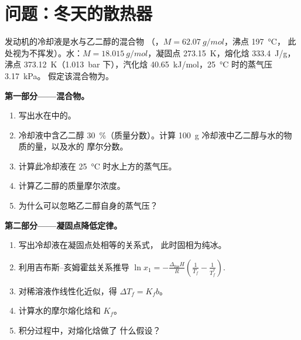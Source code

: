 \section{问题：冬天的散热器}

\begin{problem}
\label{pb:b2:chemical-potential:1}
发动机的冷却液是水与乙二醇的混合物
（，$M = \qty{62.07}{g/mol}$，沸点 \qty{197}{\celsius}，
此处视为不挥发）。水：$M = \qty{18.015}{g/mol}$，凝固点
\qty{273.15}{K}，熔化焓 \qty{333.4}{J/g}，沸点
\qty{373.12}{K}（\qty{1.013}{bar} 下），汽化焓
\qty{40.65}{kJ/mol}，\qty{25}{\celsius} 时的蒸气压 \qty{3.17}{kPa}。
假定该混合物为。

\medskip
\noindent\textbf{第一部分——混合物。}
\begin{enumerate}
  \item 写出水在中的。
  \item 冷却液中含乙二醇 \qty{30}{\percent}（质量分数）。计算 \qty{100}{g}
        冷却液中乙二醇与水的物质的量，以及水的
        摩尔分数。
  \item 计算此冷却液在
        \qty{25}{\celsius} 时水上方的蒸气压。
  \item 计算乙二醇的质量摩尔浓度。
  \item 为什么可以忽略乙二醇自身的蒸气压？
\end{enumerate}

\medskip
\noindent\textbf{第二部分——凝固点降低定律。}
\begin{enumerate}[resume]
  \item 写出冷却液在凝固点处相等的关系式，
        此时固相为纯冰。
  \item 利用吉布斯–亥姆霍兹关系推导 $\ln x_1 =
        -\frac{\Delta_{\text{fus}}H}{R}\left(\frac1{T_f} - \frac1{T_f^*}\right)$.
  \item 对稀溶液作线性化近似，得 $\Delta T_f = K_f b$。
  \item 计算水的摩尔熔化焓和 $K_f$。
  \item 积分过程中，对熔化焓做了
        什么假设？
\end{enumerate}


\end{problem}

